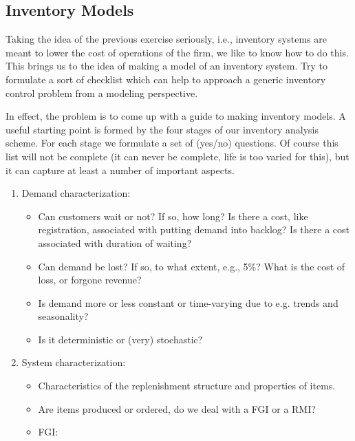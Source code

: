 \subsection{Inventory Models}

\begin{question}\label{4step}
  Taking the idea of the previous exercise seriously, i.e.,
  inventory systems are meant to lower the cost of operations of the
  firm, we like to know how to do this. This brings us to the idea of
  making a model of an inventory system. Try to formulate a
  sort of checklist which can help to approach a generic inventory control problem from a modeling perspective.
\end{question}

  \begin{solution}
    In effect, the problem is to come up with a guide to making
    inventory models.  A useful starting point is formed by the four
    stages of our inventory analysis scheme.  For each stage we
    formulate a set of (yes/no) questions. Of course this list will not
    be complete (it can never be complete, life is too varied for
    this), but it can capture at least a number of important aspects.
    \begin{enumerate}
    \item Demand characterization:
      \begin{itemize}
      \item Can customers wait or not?  If so, how long? Is there a
        cost, like registration, associated with putting demand into
        backlog? Is there a cost associated with duration of waiting?
      \item Can demand be lost? If so, to what extent, e.g., 5\%? What
        is the cost of loss, or forgone revenue? 
      \item Is demand more or less constant or time-varying due to e.g. trends and seasonality?
      \item Is it deterministic or (very) stochastic? 
      \end{itemize}
    \item System characterization: 
      \begin{itemize}
      \item Characteristics of the replenishment structure and properties of items. 
      \item Are items produced or ordered, do we deal with a FGI or a RMI? 
      \item FGI:
      \begin{itemize}

\end{itemize}
\end{itemize}
\end{enumerate}
\end{solution}
